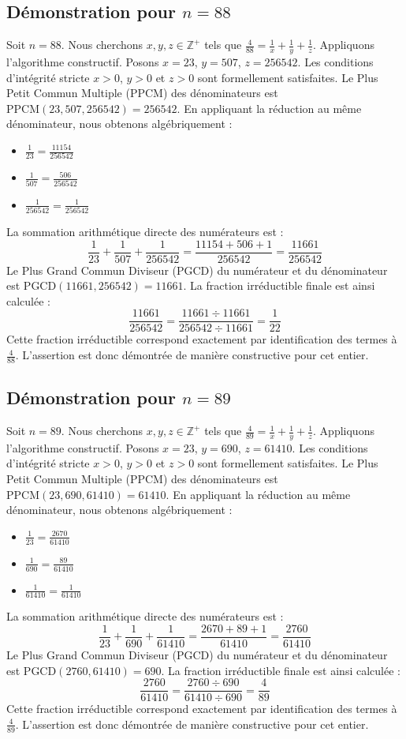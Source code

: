 \documentclass[11pt,a4paper]{article}
\begin{document}
\subsection{Démonstration pour $n = 88$}
Soit $n = 88$. Nous cherchons $x, y, z \in \mathbb{Z}^{+}$ tels que $\frac{4}{88} = \frac{1}{x} + \frac{1}{y} + \frac{1}{z}$.
Appliquons l'algorithme constructif. Posons $x = 23$, $y = 507$, $z = 256542$.
Les conditions d'intégrité stricte $x > 0$, $y > 0$ et $z > 0$ sont formellement satisfaites.
Le Plus Petit Commun Multiple (PPCM) des dénominateurs est $\text{PPCM}(23, 507, 256542) = 256542$.
En appliquant la réduction au même dénominateur, nous obtenons algébriquement :
\begin{itemize}
    \item $\frac{1}{23} = \frac{11154}{256542}$
    \item $\frac{1}{507} = \frac{506}{256542}$
    \item $\frac{1}{256542} = \frac{1}{256542}$
\end{itemize}
La sommation arithmétique directe des numérateurs est :
$$ \frac{1}{23} + \frac{1}{507} + \frac{1}{256542} = \frac{11154 + 506 + 1}{256542} = \frac{11661}{256542} $$
Le Plus Grand Commun Diviseur (PGCD) du numérateur et du dénominateur est $\text{PGCD}(11661, 256542) = 11661$.
La fraction irréductible finale est ainsi calculée :
$$ \frac{11661}{256542} = \frac{11661 \div 11661}{256542 \div 11661} = \frac{1}{22} $$
Cette fraction irréductible correspond exactement par identification des termes à $\frac{4}{88}$. L'assertion est donc démontrée de manière constructive pour cet entier.

\subsection{Démonstration pour $n = 89$}
Soit $n = 89$. Nous cherchons $x, y, z \in \mathbb{Z}^{+}$ tels que $\frac{4}{89} = \frac{1}{x} + \frac{1}{y} + \frac{1}{z}$.
Appliquons l'algorithme constructif. Posons $x = 23$, $y = 690$, $z = 61410$.
Les conditions d'intégrité stricte $x > 0$, $y > 0$ et $z > 0$ sont formellement satisfaites.
Le Plus Petit Commun Multiple (PPCM) des dénominateurs est $\text{PPCM}(23, 690, 61410) = 61410$.
En appliquant la réduction au même dénominateur, nous obtenons algébriquement :
\begin{itemize}
    \item $\frac{1}{23} = \frac{2670}{61410}$
    \item $\frac{1}{690} = \frac{89}{61410}$
    \item $\frac{1}{61410} = \frac{1}{61410}$
\end{itemize}
La sommation arithmétique directe des numérateurs est :
$$ \frac{1}{23} + \frac{1}{690} + \frac{1}{61410} = \frac{2670 + 89 + 1}{61410} = \frac{2760}{61410} $$
Le Plus Grand Commun Diviseur (PGCD) du numérateur et du dénominateur est $\text{PGCD}(2760, 61410) = 690$.
La fraction irréductible finale est ainsi calculée :
$$ \frac{2760}{61410} = \frac{2760 \div 690}{61410 \div 690} = \frac{4}{89} $$
Cette fraction irréductible correspond exactement par identification des termes à $\frac{4}{89}$. L'assertion est donc démontrée de manière constructive pour cet entier.
\end{document}

